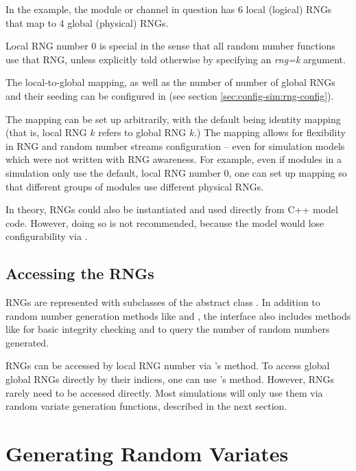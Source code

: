 In the example, the module or channel in question has 6 local (logical)
RNGs that map to 4 global (physical) RNGs.

\begin{note}
Local RNG number 0 is special in the sense that all random number functions
use that RNG, unless explicitly told otherwise by specifying an \textit{rng=k}
argument.
\end{note}

The local-to-global mapping, as well as the number of number of global
RNGs and their seeding can be configured in  (see
section \ref{sec:config-sim:rng-config}).

The mapping can be set up arbitrarily, with the default being identity
mapping (that is, local RNG $k$ refers to global RNG $k$.) The mapping
allows for flexibility in RNG and random number streams configuration
-- even for simulation models which were not written with RNG awareness.
For example, even if modules in a simulation only use the default, local
RNG number 0, one can set up mapping so that different groups of modules
use different physical RNGs.

In theory, RNGs could also be instantiated and used directly from C++ model
code. However, doing so is not recommended, because the model would lose
configurability via .

\subsection{Accessing the RNGs}
\label{sec:sim-lib:accessing-rngs}

RNGs are represented with subclasses of the abstract class .
In addition to random number generation methods like  and
, the  interface also includes methods like
 for basic integrity checking and 
to query the number of random numbers generated.

RNGs can be accessed by local RNG number via 's
 method. To access global global RNGs directly by their
indices, one can use 's  method.
However, RNGs rarely need to be accessed directly. Most simulations will
only use them via random variate generation functions, described in the
next section.


\section{Generating Random Variates}
\label{sec:sim-lib:random-variate-generation}

